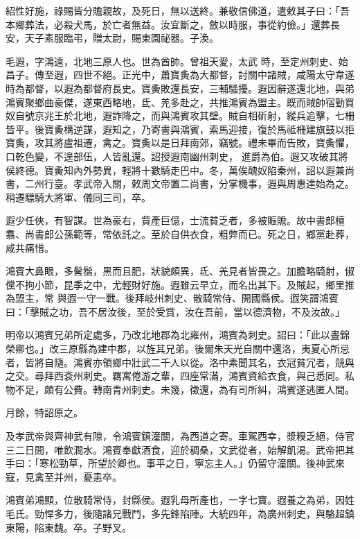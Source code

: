 \begin{pinyinscope}
 紹性好施，祿賜皆分贍親故，及死日，無以送終。兼敬信佛道，遣敕其子曰：「吾本鄉葬法，必殺犬馬，於亡者無益。汝宜斷之，斂以時服，事從約儉。」還葬長安，天子素服臨弔，贈太尉，賜東園祕器。子渙。



 毛遐，字鴻遠，北地三原人也。世為酋帥。曾祖天愛，太武
 時，至定州刺史、始昌子。傳至遐，四世不絕。正光中，蕭寶夤為大都督，討關中諸賊，咸陽太守韋遂時為都督，以遐為都督府長史。寶夤敗還長安，三輔騷擾。遐因辭遂還北地，與弟鴻賓聚鄉曲豪傑，遂東西略地，氐、羌多赴之，共推鴻賓為盟主。既而賊帥宿勤買奴自號京兆王於北地，遐詐降之，而與鴻賓攻其壁。賊自相斫射，縱兵追擊，七柵皆平。後寶夤構逆謀，遐知之，乃寄書與鴻賓，索馬迎接，復於馬祗柵建旗鼓以拒寶夤，攻其將盧祖遷，禽之。寶夤以是日拜南郊，竊號。禮未畢而告敗，寶夤懼，口乾色變，不遑部伍，人皆亂還。詔授遐南幽州刺史，
 進爵為伯。遐又攻破其將侯終德。寶夤知內外勢異，輕將十數騎走巴中。冬，萬俟醜奴陷秦州，詔以遐兼尚書，二州行臺。孝武帝入關，敕周文帝置二尚書，分掌機事，遐與周惠達始為之。稍遷驃騎大將軍、儀同三司，卒。



 遐少任俠，有智謀。世為豪右，貲產巨億，士流貧乏者，多被賑贍。故中書郎檀翥、尚書郎公孫範等，常依託之。至於自供衣食，粗弊而已。死之日，鄉黨赴葬，咸共痛惜。



 鴻賓大鼻眼，多鬢鬚，黑而且肥，狀貌頗異，氐、羌見者皆畏之。加膽略騎射，俶儻不拘小節，昆季之中，尤輕財好施。遐雖云早立，而名出其下。及賊起，鄉里推為盟主，常
 與遐一守一戰。後拜岐州刺史、散騎常侍、開國縣侯。遐笑謂鴻賓曰：「擊賊之功，吾不居汝後，至於受賞，汝在吾前，當以德濟物，不及汝故。」



 明帝以鴻賓兄弟所定處多，乃改北地郡為北雍州，鴻賓為刺史。詔曰：「此以晝錦榮卿也。」改三原縣為建中郡，以旌其兄弟。後爾朱天光自關中還洛，夷夏心所忌者，皆將自隨。鴻賓亦領鄉中壯武二千人以從。洛中素聞其名，衣冠貧冗者，競與之交。尋拜西袞州刺史。羈寓倦游之輩，四座常滿，鴻賓資給衣食，與己悉同。私物不足，頗有公費。轉南青州刺史。未幾，徵還，為有司所糾，鴻賓遂逃匿人間。



 月餘，特詔原之。



 及孝武帝與齊神武有隙，令鴻賓鎮潼關，為西道之寄。車駕西幸，漿糗乏絕，侍官三二日間，唯飲澗水。鴻賓奉獻酒食，迎於稠桑，文武從者，始解飢渴。武帝把其手曰：「寒松勁草，所望於卿也。事平之日，寧忘主人。」仍留守潼關。後神武來寇，見禽至并州，憂恚卒。



 鴻賓弟鴻顯，位散騎常侍，封縣侯。遐乳母所產也，一字七寶。遐養之為弟，因姓毛氏。勁悍多力，後隨諸兄戰鬥，多先鋒陷陣。大統四年，為廣州刺史，與駱超鎮東陽，陷東魏。卒。子野叉。




\end{pinyinscope}
